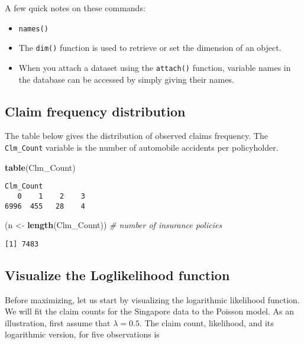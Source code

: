 \documentclass[]{book}
\newenvironment{Shaded}{\begin{snugshade}}{\end{snugshade}}
\newcommand{\KeywordTok}[1]{\textcolor[rgb]{0.13,0.29,0.53}{\textbf{#1}}}
\newcommand{\StringTok}[1]{\textcolor[rgb]{0.31,0.60,0.02}{#1}}
\newcommand{\CommentTok}[1]{\textcolor[rgb]{0.56,0.35,0.01}{\textit{#1}}}
\newcommand{\NormalTok}[1]{#1}
\providecommand{\tightlist}{%
  \setlength{\itemsep}{0pt}\setlength{\parskip}{0pt}}
\theoremstyle{definition}
\theoremstyle{definition}
\theoremstyle{definition}
\theoremstyle{remark}
\begin{document}
A few quick notes on these commands:

\begin{itemize}
\tightlist
\item
  \texttt{names()}
\item
  The \texttt{dim()} function is used to retrieve or set the dimension
  of an object.
\item
  When you attach a dataset using the \texttt{attach()} function,
  variable names in the database can be accessed by simply giving their
  names.
\end{itemize}

\subsection{Claim frequency
distribution}\label{claim-frequency-distribution-1}

The table below gives the distribution of observed claims frequency. The
\texttt{Clm\_Count} variable is the number of automobile accidents per
policyholder.

\begin{Shaded}
\begin{Highlighting}[]
\KeywordTok{table}\NormalTok{(Clm_Count) }
\end{Highlighting}
\end{Shaded}

\begin{verbatim}
Clm_Count
   0    1    2    3 
6996  455   28    4 
\end{verbatim}

\begin{Shaded}
\begin{Highlighting}[]
\NormalTok{(n <-}\StringTok{ }\KeywordTok{length}\NormalTok{(Clm_Count))  }\CommentTok{# number of insurance policies }
\end{Highlighting}
\end{Shaded}

\begin{verbatim}
[1] 7483
\end{verbatim}

\subsection{Visualize the Loglikelihood
function}\label{visualize-the-loglikelihood-function}

Before maximizing, let us start by visualizing the logarithmic
likelihood function. We will fit the claim counts for the Singapore data
to the Poisson model. As an illustration, first assume that
\(\lambda = 0.5\). The claim count, likelihood, and its logarithmic
version, for five observations is
\end{document}
